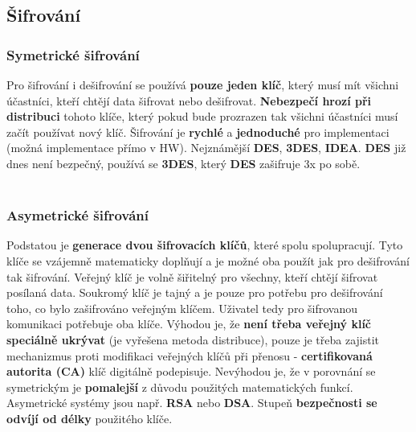 \subsection*{Šifrování}
\subsubsection*{Symetrické šifrování}
Pro šifrování i dešifrování se používá \textbf{pouze jeden klíč}, který musí mít všichni účastníci, kteří chtějí data šifrovat nebo dešifrovat. \textbf{Nebezpečí hrozí při distribuci }tohoto klíče, který pokud bude prozrazen tak všichni účastníci musí začít používat nový klíč.  Šifrování je \textbf{rychlé} a \textbf{jednoduché} pro implementaci (možná implementace přímo v HW). Nejznámější \textbf{DES}, \textbf{3DES}, \textbf{IDEA}. \textbf{DES} již dnes není bezpečný, používá se \textbf{3DES}, který \textbf{DES} zašifruje 3x po sobě.
\\\\
\noindent{}

\subsubsection*{Asymetrické šifrování}
Podstatou je \textbf{generace dvou šifrovacích klíčů}, které spolu spolupracují. Tyto klíče se vzájemně matematicky doplňují a je možné oba použít jak pro dešifrování tak šifrování. Veřejný klíč je volně šiřitelný pro všechny, kteří chtějí šifrovat posílaná data. Soukromý klíč je tajný a je pouze pro potřebu pro dešifrování toho, co bylo zašifrováno veřejným klíčem. Uživatel tedy pro šifrovanou komunikaci potřebuje oba klíče. Výhodou je, že\textbf{ není třeba veřejný klíč speciálně ukrývat} (je vyřešena metoda distribuce), pouze je třeba zajistit mechanizmus proti modifikaci veřejných klíčů při přenosu - \textbf{certifikovaná autorita (CA)} klíč digitálně podepisuje. Nevýhodou je, že v porovnání se symetrickým je \textbf{pomalejší} z důvodu použitých matematických funkcí. Asymetrické systémy jsou např. \textbf{RSA} nebo \textbf{DSA}. Stupeň \textbf{bezpečnosti se odvíjí od délky} použitého klíče.
\\\\
\noindent{}


